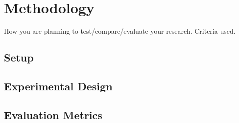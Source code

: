 \documentclass[report.tex]{subfiles}
\begin{document}
    \chapter{Methodology}

    How you are planning to test/compare/evaluate your research.
    Criteria used.

    \section{Setup}

    \section{Experimental Design}

    \section{Evaluation Metrics}

    
\end{document}
